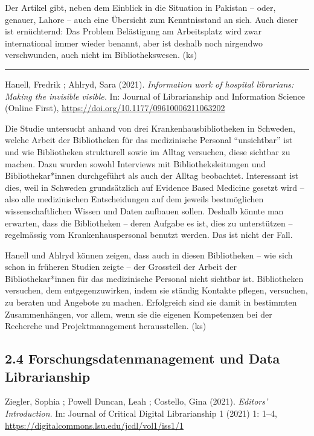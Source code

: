 \documentclass[a4paper,
fontsize=11pt,
oneside,
numbers=noperiodatend,
parskip=half-,
bibliography=totoc,
final
]{scrartcl}
\begin{document}
Der Artikel gibt, neben dem Einblick in die Situation in Pakistan --
oder, genauer, Lahore -- auch eine Übersicht zum Kenntnisstand an sich.
Auch dieser ist ernüchternd: Das Problem Belästigung am Arbeitsplatz
wird zwar international immer wieder benannt, aber ist deshalb noch
nirgendwo verschwunden, auch nicht im Bibliothekswesen. (ks)

\begin{center}\rule{0.5\linewidth}{0.5pt}\end{center}

Hanell, Fredrik ; Ahlryd, Sara (2021). \emph{Information work of
hospital librarians: Making the invisible visible.} In: Journal of
Librarianship and Information Science (Online First),
\url{https://doi.org/10.1177/09610006211063202}

Die Studie untersucht anhand von drei Krankenhausbibliotheken in
Schweden, welche Arbeit der Bibliotheken für das medizinische Personal
\enquote{unsichtbar} ist und wie Bibliotheken strukturell sowie im
Alltag versuchen, diese sichtbar zu machen. Dazu wurden sowohl
Interviews mit Bibliotheksleitungen und Bibliothekar*innen durchgeführt
als auch der Alltag beobachtet. Interessant ist dies, weil in Schweden
grundsätzlich auf Evidence Based Medicine gesetzt wird -- also alle
medizinischen Entscheidungen auf dem jeweils bestmöglichen
wissenschaftlichen Wissen und Daten aufbauen sollen. Deshalb könnte man
erwarten, dass die Bibliotheken -- deren Aufgabe es ist, dies zu
unterstützen -- regelmässig vom Krankenhauspersonal benutzt werden. Das
ist nicht der Fall.

Hanell und Ahlryd können zeigen, dass auch in diesen Bibliotheken -- wie
sich schon in früheren Studien zeigte -- der Grossteil der Arbeit der
Bibliothekar*innen für das medizinische Personal nicht sichtbar ist.
Bibliotheken versuchen, dem entgegenzuwirken, indem sie ständig Kontakte
pflegen, versuchen, zu beraten und Angebote zu machen. Erfolgreich sind
sie damit in bestimmten Zusammenhängen, vor allem, wenn sie die eigenen
Kompetenzen bei der Recherche und Projektmanagement herausstellen. (ks)

\hypertarget{forschungsdatenmanagement-und-data-librarianship}{%
\subsection{2.4 Forschungsdatenmanagement und Data
Librarianship}\label{forschungsdatenmanagement-und-data-librarianship}}

Ziegler, Sophia ; Powell Duncan, Leah ; Costello, Gina (2021).
\emph{Editors' Introduction}. In: Journal of Critical Digital
Librarianship 1 (2021) 1: 1--4,
\url{https://digitalcommons.lsu.edu/jcdl/vol1/iss1/1}
\end{document}

